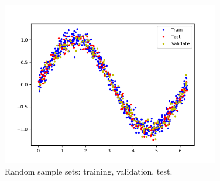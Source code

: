 \begin{frame}
    \begin{figure}
        \includegraphics[width=0.85\textwidth]{images/tflite/colab/sets.png}
        \caption{Random sample sets: training, validation, test.}
    \end{figure}
\end{frame}